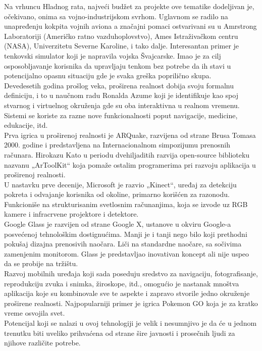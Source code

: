 \documentclass[a4paper]{article}
\begin{document}
    Na vrhuncu Hladnog rata, najveći budžet za projekte ove tematike dodeljivan je, očekivano, onima sa vojno-industrijskom svrhom. Uglavnom se radilo na unapređenju kokpita vojnih aviona a značajni pomaci ostvarivani su u Amrstrong Laboratoriji (Američko ratno vazduhoplovstvo), Ames Istraživačkom centru (NASA), Univerzitetu Severne Karoline, i tako dalje. Interesantan primer je tenkovski simulator koji je napravila vojska Švajcarske. Imao je za cilj osposobljavanje korisnika da upravljaju tenkom bez potrebe da ih stavi u potencijalno opasnu situaciju gde je svaka greška poprilično skupa.\\
    Devedesetih godina prošlog veka, proširena realnost dobija svoju formalnu definiciju, i to u naučnom radu Ronalda Azume koji je identifikuje kao spoj stvarnog i virtuelnog okruženja gde su oba interaktivna u realnom vremenu. Sistemi se koriste za razne nove funkcionalnosti poput navigacije, medicine, edukacije, itd.\\
    Prva igrica u proširenoj realnosti je ARQuake, razvijena od strane Brusa Tomasa 2000. godine i predstavljena na Internacionalnom simpozijumu prenosnih računara. Hirokazu Kato u periodu dvehiljaditih razvija open-source biblioteku nazvanu „ArToolKit“ koja pomaže ostalim programerima pri razvoju aplikacija u proširenoj realnosti.\\ 
    U nastavku prve decenije, Microsoft je razvio „Kinect“, uređaj za detekciju pokreta i odvajanje korisnika od okoline, primarno korišćen za razonodu. Funkcioniše na strukturisanim svetlosnim računanjima, koja se izvode uz RGB kamere i infracrvene projektore i detektore.\\
    Google Glass je razvijen od strane Google X, ustanove u okviru Google-a posvećenoj tehnološkim dostignućima. Manji je i tanji nego bilo koji prethodni pokušaj dizajna prenosivih naočara. Liči na standardne naočare, sa sočivima zamenjenim monitorom. Glass je predstavljao inovativan koncept ali nije uspeo da se probije na tržištu.\\
    Razvoj mobilnih uređaja koji sada poseduju sredstvo za navigaciju, fotografisanje, reprodukciju zvuka i snimka, žiroskope, itd., omogućio je nastanak mnoštva aplikacija koje su kombinovale sve te aspekte i zapravo stvorile jedno okruženje proširene realnosti. Najpopularniji primer je igrica Pokemon GO koja je za kratko vreme osvojila svet.\\ 
    Potencijal koji se nalazi u ovoj tehnologiji je velik i nesumnjivo je da će u jednom trenutku biti uveliko prihvaćena od strane šire javnosti i prosečnih ljudi za njihove različite potrebe.
	
\end{document}
